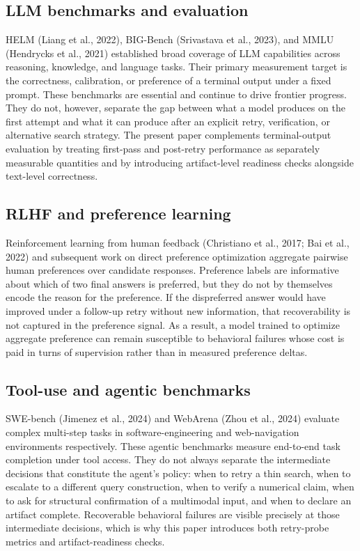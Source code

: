 \documentclass[11pt]{article}
\begin{document}
\subsection{LLM benchmarks and evaluation}
HELM (Liang et al., 2022), BIG-Bench (Srivastava et al., 2023), and MMLU (Hendrycks et al., 2021) established broad coverage of LLM capabilities across reasoning, knowledge, and language tasks. Their primary measurement target is the correctness, calibration, or preference of a terminal output under a fixed prompt. These benchmarks are essential and continue to drive frontier progress. They do not, however, separate the gap between what a model produces on the first attempt and what it can produce after an explicit retry, verification, or alternative search strategy. The present paper complements terminal-output evaluation by treating first-pass and post-retry performance as separately measurable quantities and by introducing artifact-level readiness checks alongside text-level correctness.

\subsection{RLHF and preference learning}
Reinforcement learning from human feedback (Christiano et al., 2017; Bai et al., 2022) and subsequent work on direct preference optimization aggregate pairwise human preferences over candidate responses. Preference labels are informative about which of two final answers is preferred, but they do not by themselves encode the reason for the preference. If the dispreferred answer would have improved under a follow-up retry without new information, that recoverability is not captured in the preference signal. As a result, a model trained to optimize aggregate preference can remain susceptible to behavioral failures whose cost is paid in turns of supervision rather than in measured preference deltas.

\subsection{Tool-use and agentic benchmarks}
SWE-bench (Jimenez et al., 2024) and WebArena (Zhou et al., 2024) evaluate complex multi-step tasks in software-engineering and web-navigation environments respectively. These agentic benchmarks measure end-to-end task completion under tool access. They do not always separate the intermediate decisions that constitute the agent's policy: when to retry a thin search, when to escalate to a different query construction, when to verify a numerical claim, when to ask for structural confirmation of a multimodal input, and when to declare an artifact complete. Recoverable behavioral failures are visible precisely at those intermediate decisions, which is why this paper introduces both retry-probe metrics and artifact-readiness checks.
\end{document}
